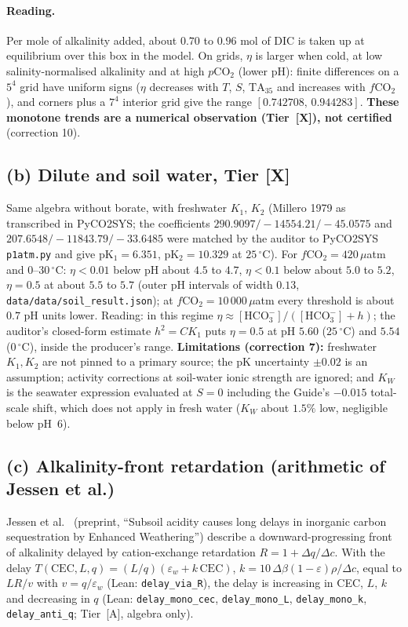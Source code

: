 \documentclass[10pt]{article}
\newcommand{\tier}[1]{\textsf{[#1]}}
\newcommand{\tA}{\tier{A}}
\newcommand{\tX}{\tier{X}}
\newcommand{\lean}[1]{\texttt{#1}}
\newcommand{\COtwo}{CO$_2$}
\begin{document}
\paragraph{Reading.} Per mole of alkalinity added, about $0.70$ to $0.96$ mol of DIC is taken up at equilibrium over this box in the model. On grids, $\eta$ is larger when cold, at low salinity-normalised alkalinity and at high $p$\COtwo{} (lower pH): finite differences on a $5^4$ grid have uniform signs ($\eta$ decreases with $T$, $S$, $\mathrm{TA}_{35}$ and increases with $f\mathrm{CO_2}$), and corners plus a $7^4$ interior grid give the range $[0.742708,\,0.944283]$. \textbf{These monotone trends are a numerical observation (Tier~\tX{}), not certified} (correction 10).

\subsection{(b) Dilute and soil water, Tier \tX{}}
Same algebra without borate, with freshwater $K_1$, $K_2$ (Millero 1979 as transcribed in PyCO2SYS; the coefficients $290.9097/-14554.21/-45.0575$ and $207.6548/-11843.79/-33.6485$ were matched by the auditor to PyCO2SYS \texttt{p1atm.py} and give pK$_1=6.351$, pK$_2=10.329$ at $25\,^\circ$C). For $f\mathrm{CO_2}=420\,\mu$atm and $0$--$30\,^\circ$C: $\eta<0.01$ below pH about $4.5$ to $4.7$, $\eta<0.1$ below about $5.0$ to $5.2$, $\eta=0.5$ at about $5.5$ to $5.7$ (outer pH intervals of width $0.13$, \texttt{data/data/soil\_result.json}); at $f\mathrm{CO_2}=10\,000\,\mu$atm every threshold is about $0.7$ pH units lower. Reading: in this regime $\eta\approx[\mathrm{HCO_3^-}]/([\mathrm{HCO_3^-}]+h)$; the auditor's closed-form estimate $h^2=CK_1$ puts $\eta=0.5$ at pH $5.60$ ($25\,^\circ$C) and $5.54$ ($0\,^\circ$C), inside the producer's range. \textbf{Limitations (correction 7):} freshwater $K_1,K_2$ are not pinned to a primary source; the pK uncertainty $\pm0.02$ is an assumption; activity corrections at soil-water ionic strength are ignored; and $K_W$ is the seawater expression evaluated at $S=0$ including the Guide's $-0.015$ total-scale shift, which does not apply in fresh water ($K_W$ about $1.5\%$ low, negligible below pH~$6$).

\subsection{(c) Alkalinity-front retardation (arithmetic of Jessen et al.)}
Jessen et al.~\cite{jessen} (preprint, ``Subsoil acidity causes long delays in inorganic carbon sequestration by Enhanced Weathering'') describe a downward-progressing front of alkalinity delayed by cation-exchange retardation $R=1+\Delta q/\Delta c$. With the delay $T(\mathrm{CEC},L,q)=(L/q)(\varepsilon_w+k\,\mathrm{CEC})$, $k=10\,\Delta\beta(1-\varepsilon)\rho/\Delta c$, equal to $LR/v$ with $v=q/\varepsilon_w$ (Lean: \lean{delay\_via\_R}), the delay is increasing in CEC, $L$, $k$ and decreasing in $q$ (Lean: \lean{delay\_mono\_cec}, \lean{delay\_mono\_L}, \lean{delay\_mono\_k}, \lean{delay\_anti\_q}; Tier~\tA{}, algebra only).
\end{document}
